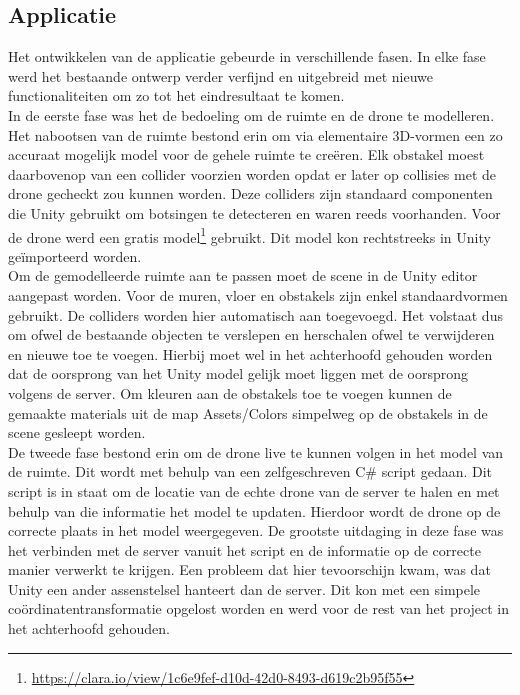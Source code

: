 \subsection{Applicatie} \label{sec:unity}
Het ontwikkelen van de applicatie gebeurde in verschillende fasen. In elke fase werd het bestaande ontwerp verder verfijnd en uitgebreid met nieuwe functionaliteiten om zo tot het eindresultaat te komen.\\

In de eerste fase was het de bedoeling om de ruimte en de drone te modelleren. Het nabootsen van de ruimte bestond erin om via elementaire 3D-vormen een zo accuraat mogelijk model voor de gehele ruimte te cre\"eren. Elk obstakel moest daarbovenop van een collider voorzien worden opdat er later op collisies met de drone gecheckt zou kunnen worden. Deze colliders zijn standaard componenten die Unity gebruikt om botsingen te detecteren en waren reeds voorhanden. Voor de drone werd een gratis model\footnote{\url{https://clara.io/view/1c6e9fef-d10d-42d0-8493-d619c2b95f55}} gebruikt. Dit model kon rechtstreeks in Unity ge\"importeerd worden. \\

Om de gemodelleerde ruimte aan te passen moet de scene in de Unity editor aangepast worden. Voor de muren, vloer en obstakels zijn enkel standaardvormen gebruikt. De colliders worden hier automatisch aan toegevoegd. Het volstaat dus om ofwel de bestaande objecten te verslepen en herschalen ofwel te verwijderen en nieuwe toe te voegen. Hierbij moet wel in het achterhoofd gehouden worden dat de oorsprong van het Unity model gelijk moet liggen met de oorsprong volgens de server. Om kleuren aan de obstakels toe te voegen kunnen de gemaakte materials uit de map Assets/Colors simpelweg op de obstakels in de scene gesleept worden.\\

De tweede fase bestond erin om de drone live te kunnen volgen in het model van de ruimte. Dit wordt met behulp van een zelfgeschreven C\# script gedaan. Dit script is in staat om de locatie van de echte drone van de server te halen en met behulp van die informatie het model te updaten. Hierdoor wordt de drone op de correcte plaats in het model weergegeven. De grootste uitdaging in deze fase was het verbinden met de server vanuit het script en de informatie op de correcte manier verwerkt te krijgen. Een probleem dat hier tevoorschijn kwam, was dat Unity een ander assenstelsel hanteert dan de server. Dit kon met een simpele co\"ordinatentransformatie opgelost worden en werd voor de rest van het project in het achterhoofd gehouden.\\

